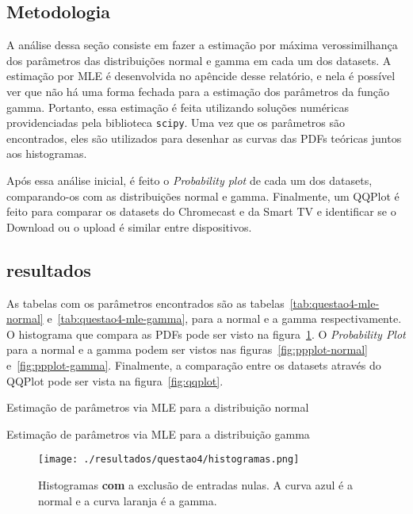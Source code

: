 \documentclass{article}
\begin{document}
\subsection{Metodologia}

A análise dessa seção consiste em fazer a estimação por máxima verossimilhança dos parâmetros das distribuições normal e gamma em cada um dos datasets. A estimação por MLE é desenvolvida no apêncide desse relatório, e nela é possível ver que não há uma forma fechada para a estimação dos parâmetros da função gamma. Portanto, essa estimação é feita utilizando soluções numéricas providenciadas pela biblioteca \texttt{scipy}. Uma vez que os parâmetros são encontrados, eles são utilizados para desenhar as curvas das PDFs teóricas juntos aos histogramas.

Após essa análise inicial, é feito o \textit{Probability plot} de cada um dos datasets, comparando-os com as distribuições normal e gamma. Finalmente, um QQPlot é feito para comparar os datasets do Chromecast e da Smart TV e identificar se o Download ou o upload é similar entre dispositivos.

\subsection{resultados}

As tabelas com os parâmetros encontrados são as tabelas~\ref{tab:questao4-mle-normal} e~\ref{tab:questao4-mle-gamma}, para a normal e a gamma respectivamente. O histograma que compara as PDFs pode ser visto na figura~\ref{fig:histogramas-ajuste}. O \textit{Probability Plot} para a normal e a gamma podem ser vistos nas figuras~\ref{fig:ppplot-normal} e~\ref{fig:ppplot-gamma}. Finalmente, a comparação entre os datasets através do QQPlot pode ser vista na figura~\ref{fig:qqplot}.

\begin{table}[h]
	\centering
	
	\caption{Estimação de parâmetros via MLE para a distribuição normal}
	\label{tab:questao4-mle-normal}
\end{table}

\begin{table}[h]
	\centering
	
	\caption{Estimação de parâmetros via MLE para a distribuição gamma}
	\label{tab:questao4-mle-gamma}
\end{table}

\begin{figure}[h]
	\centering
	\caption{Histogramas \textbf{com} a exclusão de entradas nulas. A curva azul é a normal e a curva laranja é a gamma.}
	\texttt{[image: ./resultados/questao4/histogramas.png]}
	\label{fig:histogramas-ajuste}
\end{figure}
\end{document}
